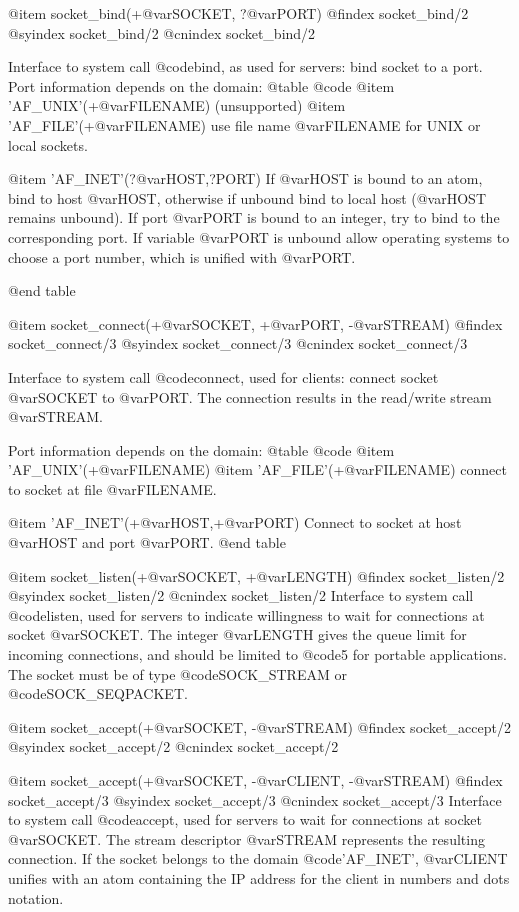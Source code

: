 {{{{{{@item socket_bind(+@var{SOCKET}, ?@var{PORT})
@findex socket_bind/2
@syindex socket_bind/2
@cnindex socket_bind/2

Interface to system call @code{bind}, as used for servers: bind socket
to a port. Port information depends on the domain:
@table @code
@item 'AF_UNIX'(+@var{FILENAME}) (unsupported)
@item 'AF_FILE'(+@var{FILENAME})
use file name @var{FILENAME} for UNIX or local sockets.

@item 'AF_INET'(?@var{HOST},?PORT)
If @var{HOST} is bound to an atom, bind to host @var{HOST}, otherwise
if unbound bind to local host (@var{HOST} remains unbound). If port
@var{PORT} is bound to an integer, try to bind to the corresponding
port. If variable @var{PORT} is unbound allow operating systems to
choose a port number, which is unified with @var{PORT}.

@end table

@item socket_connect(+@var{SOCKET}, +@var{PORT}, -@var{STREAM})
@findex socket_connect/3
@syindex socket_connect/3
@cnindex socket_connect/3

Interface to system call @code{connect}, used for clients: connect
socket @var{SOCKET} to @var{PORT}. The connection results in the
read/write stream @var{STREAM}.

Port information depends on the domain:
@table @code
@item 'AF_UNIX'(+@var{FILENAME})
@item 'AF_FILE'(+@var{FILENAME})
connect to socket at file @var{FILENAME}.

@item 'AF_INET'(+@var{HOST},+@var{PORT})
Connect to socket at host @var{HOST} and port @var{PORT}.
@end table

@item socket_listen(+@var{SOCKET}, +@var{LENGTH})
@findex socket_listen/2
@syindex socket_listen/2
@cnindex socket_listen/2
Interface to system call @code{listen}, used for servers to indicate
willingness to wait for connections at socket @var{SOCKET}. The
integer @var{LENGTH} gives the queue limit for incoming connections,
and should be limited to @code{5} for portable applications. The socket
must be of type @code{SOCK_STREAM} or @code{SOCK_SEQPACKET}.

@item socket_accept(+@var{SOCKET}, -@var{STREAM})
@findex socket_accept/2
@syindex socket_accept/2
@cnindex socket_accept/2

@item socket_accept(+@var{SOCKET}, -@var{CLIENT}, -@var{STREAM})
@findex socket_accept/3
@syindex socket_accept/3
@cnindex socket_accept/3
Interface to system call @code{accept}, used for servers to wait for
connections at socket @var{SOCKET}. The stream descriptor @var{STREAM}
represents the resulting connection.  If the socket belongs to the
domain @code{'AF_INET'}, @var{CLIENT} unifies with an atom containing
the IP address for the client in numbers and dots notation.

}}}}}}
